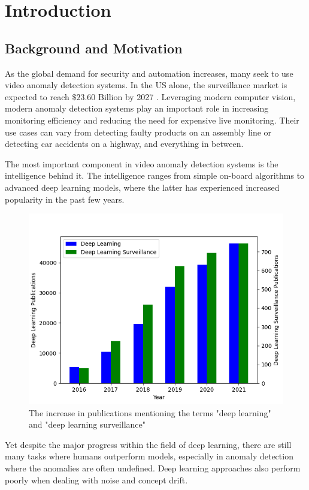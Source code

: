 \chapter{Introduction}
\label{sec:introduction}
\section{Background and Motivation}
As the global demand for security and automation increases, many seek to use video anomaly detection systems. In the US alone, the surveillance market is expected to reach $\$23.60$ Billion by 2027 \cite{us_video_stats}. Leveraging modern computer vision, modern anomaly detection systems play an important role in increasing monitoring efficiency and reducing the need for expensive live monitoring. Their use cases can vary from detecting faulty products on an assembly line or detecting car accidents on a highway, and everything in between.
\par
The most important component in video anomaly detection systems is the intelligence behind it. The intelligence ranges from simple on-board algorithms to advanced deep learning models, where the latter has experienced increased popularity in the past few years.\par
\begin{figure}[H]
    \centering
    \includegraphics[width=\linewidth]{resources/introduction/publications_graph.png}
    \caption{The increase in publications mentioning the terms "deep learning" and "deep learning surveillance" \cite{deep_learning_surveillance_stats}}
\end{figure}
Yet despite the major progress within the field of deep learning, there are still many tasks where humans outperform models, especially in anomaly detection where the anomalies are often undefined. Deep learning approaches also perform poorly when dealing with noise and concept drift.
